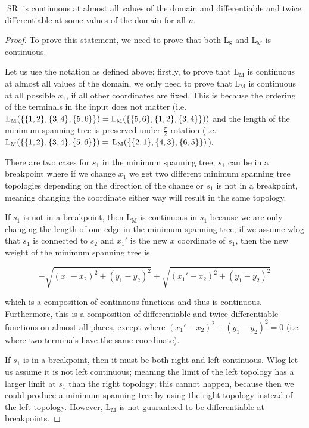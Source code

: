 \documentclass{mpaper}
\begin{document}
\begin{lemma}
  \label{l:2}
  $\operatorname{SR}$ is continuous at almost all values of the domain and differentiable and twice differentiable at some values of the domain for all $n$.
\end{lemma}
\begin{proof}
  To prove this statement, we need to prove that both $\operatorname{L_S}$ and $\operatorname{L_M}$ is continuous.

  Let us use the notation as defined above; firstly, to prove that $\operatorname{L_M}$ is continuous at almost all values of the domain, we only need to prove  that $\operatorname{L_M}$ is continuous at all possible $x_1$, if all other coordinates are fixed. This is because the ordering of the terminals in the input does not matter (i.e. $\operatorname{L_M}(\{\{1,2\}, \{3,4\}, \{5,6\}\})=\operatorname{L_M}(\{\{5,6\}, \{1,2\}, \{3,4\}\}))\\$ and the length of the minimum spanning tree is preserved under $\frac{\pi}{2}$ rotation (i.e. $\operatorname{L_M}(\{\{1,2\}, \{3,4\}, \{5,6\}\})=\\\operatorname{L_M}(\{\{2,1\}, \{4,3\}, \{6,5\}\})$).

  There are two cases for $s_1$ in the minimum spanning tree; $s_1$ can be in a breakpoint where if we change $x_1$ we get two different minimum spanning tree topologies depending on the direction of the change or $s_1$ is not in a breakpoint, meaning changing the coordinate either way will result in the same topology.

  If $s_1$ is not in a breakpoint, then $\operatorname{L_M}$ is continuous in $s_1$ because we are only changing the length of one edge in the minimum spanning tree; if we assume wlog that $s_1$ is connected to $s_2$ and $x_1'$ is the new $x$ coordinate of $s_1$, then the new weight of the minimum spanning tree is
  
  \begin{equation}
    \label{eq:3}
  -\sqrt{(x_1-x_2)^2 + (y_1-y_2)^2} + \sqrt{(x_1'-x_2)^2 + (y_1-y_2)^2}
  \end{equation}

  which is a composition of continuous functions and thus is continuous. Furthermore, this is a composition of differentiable and twice differentiable functions on almost all places, except where $(x_1'-x_2)^2 + (y_1-y_2)^2 =0$ (i.e. where two terminals have the same coordinate). 

  If $s_1$ is in a breakpoint, then it must be both right and left continuous. Wlog let us assume it is not left continuous; meaning the limit of the left topology has a larger limit at $s_1$ than the right topology; this cannot happen, because then we could produce a minimum spanning tree by using the right topology instead of the left topology. However, $\operatorname{L_M}$ is not guaranteed to be differentiable at breakpoints.


\end{proof}
\end{document}
